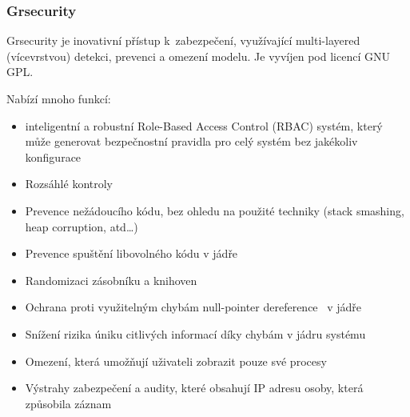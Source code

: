 \documentclass[a4paper,12pt]{article}
\begin{document}


\subsubsection{Grsecurity}

Grsecurity je inovativní přístup k~zabezpečení, využívající multi-layered (vícevrstvou) detekci, prevenci a omezení modelu. Je vyvíjen pod licencí GNU GPL.~\cite{Grsecurity}

Nabízí mnoho funkcí:
\begin{itemize}
 \item inteligentní a robustní Role-Based Access Control (RBAC) systém, který může generovat bezpečnostní pravidla pro celý systém bez jakékoliv konfigurace
 \item Rozsáhlé kontroly
 \item Prevence nežádoucího kódu, bez ohledu na použité techniky (stack smashing, heap corruption, atd…)
 \item Prevence spuštění libovolného kódu v jádře
 \item Randomizaci zásobníku a knihoven
 \item Ochrana proti využitelným chybám null-pointer dereference~\cite{Null-pointerDereference} v jádře
 \item Snížení rizika úniku citlivých informací díky chybám v jádru systému
 \item Omezení, která umožňují uživateli zobrazit pouze své procesy
 \item Výstrahy zabezpečení a audity, které obsahují IP adresu osoby, která způsobila záznam
\end{itemize}
\end{document}
